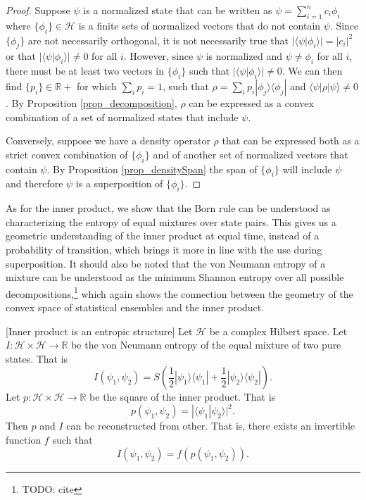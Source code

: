 \documentclass[10pt,twocolumn, nofootinbib]{revtex4-2}
\def\>{\rangle}
\def\<{\langle}
\begin{document}
\begin{proof}
	Suppose $\psi$ is a normalized state that can be written as $\psi = \sum_{i=1}^n c_i \phi_i$ where $\{\phi_i\} \in \mathcal{H}$ is a finite sets of normalized vectors that do not contain $\psi$. Since $\{\phi_j\}$ are not necessarily orthogonal, it is not necessarily true that $|\<\psi|\phi_i\>| = |c_i|^2$ or that $|\<\psi|\phi_i\>| \neq 0$ for all $i$. However, since $\psi$ is normalized and $\psi \neq \phi_i$ for all $i$, there must be at least two vectors in $\{\phi_i\}$ such that $|\<\psi|\phi_i\>| \neq 0$. We can then find $\{p_i\} \in \mathbb{R}+$ for which $\sum_i p_i =1$, such that $\rho = \sum_i p_i |\phi_j\>\<\phi_j|$ and $\<\psi|\rho|\psi\> \neq 0$. By Proposition \ref{prop_decomposition}, $\rho$ can be expressed as a convex combination of a set of normalized states that include $\psi$.
	
	Conversely, suppose we have a density operator $\rho$ that can be expressed both as a strict convex combination of $\{\phi_i\}$ and of another set of normalized vectors that contain $\psi$. By Proposition \ref{prop_densitySpan} the span of $\{\phi_i\}$ will include $\psi$ and therefore $\psi$ is a superposition of $\{\phi_i\}$.
\end{proof}

As for the inner product, we show that the Born rule can be understood as characterizing the entropy of equal mixtures over state pairs. This gives us a geometric understanding of the inner product at equal time, instead of a probability of transition, which brings it more in line with the use during superposition. It should also be noted that the von Neumann entropy of a mixture can be understood as the minimum Shannon entropy over all possible decompositions,\footnote{TODO: cite} which again shows the connection between the geometry of the convex space of statistical ensembles and the inner product.

\begin{prop}\label{prop_innerProductIsEntropy}[Inner product is an entropic structure]
Let $\mathcal{H}$ be a complex Hilbert space. Let $I : \mathcal{H} \times \mathcal{H} \to \mathbb{R}$ be the von Neumann entropy of the equal mixture of two pure states. That is
\begin{equation}
	I(\psi_1, \psi_2) = S\left(\frac{1}{2}|\psi_1\>\<\psi_1| + \frac{1}{2}|\psi_2\>\<\psi_2|\right).
\end{equation}
Let $p :  \mathcal{H} \times \mathcal{H} \to \mathbb{R}$ be the square of the inner product. That is
\begin{equation}
	p(\psi_1, \psi_2) = |\<\psi_1| \psi_2\>|^2.
\end{equation}
Then $p$ and $I$ can be reconstructed from other. That is, there exists an invertible function $f$ such that
\begin{equation}
	I(\psi_1, \psi_2) = f(p(\psi_1, \psi_2)).
\end{equation}
\end{prop}
\end{document}
